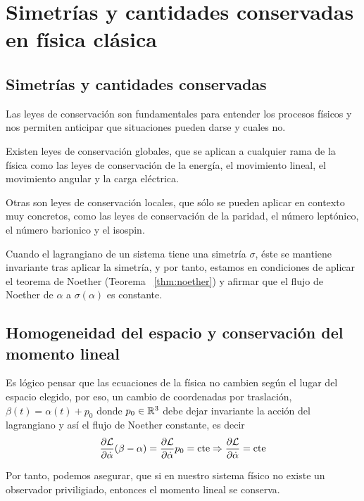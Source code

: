 \chapter{Simetrías y cantidades conservadas en física clásica}\label{ch:simetrias-y-cantidades-conservadas-en-fisica-clasica}

\section{Simetrías y cantidades conservadas}\label{sec:simetrias-y-cantidades-conservadas}

Las leyes de conservación son fundamentales para entender los procesos físicos y nos permiten anticipar que situaciones pueden darse y cuales no.

Existen leyes de conservación globales, que se aplican a cualquier rama de la física como las leyes de conservación de la energía, el movimiento lineal, el movimiento angular y la carga eléctrica.

Otras son leyes de conservación locales, que sólo se pueden aplicar en contexto muy concretos, como las leyes de conservación de la paridad, el número leptónico, el número barionico y el isospin.

Cuando el lagrangiano de un sistema tiene una simetría $\sigma$, éste se mantiene invariante tras aplicar la simetría, y por tanto, estamos en condiciones de aplicar el teorema de Noether (Teorema ~\eqref{thm:noether}) y afirmar que el flujo de Noether de $\alpha$ a $\sigma(\alpha)$ es constante.

\section{Homogeneidad del espacio y conservación del momento lineal}\label{sec:homogeneidad-del-espacio-y-conservacion-del-momento-lineal}
Es lógico pensar que las ecuaciones de la física no cambien según el lugar del espacio elegido, por eso, un cambio de coordenadas por traslación, $\beta(t)=\alpha(t)+p_0$ donde $p_0\in\mathbb{R}^3$ debe dejar invariante la acción del lagrangiano y así el flujo de Noether constante, es decir
\begin{equation}
	\label{eq:conservacion_momento_lineal}
	\frac{\partial \mathcal{L}}{\partial\dot{\alpha}}(\beta-\alpha) = \frac{\partial \mathcal{L}}{\partial\dot{\alpha}}p_0=\text{cte}\Rightarrow\frac{\partial \mathcal{L}}{\partial\dot{\alpha}}=\text{cte}
\end{equation}

Por tanto, podemos asegurar, que si en nuestro sistema físico no existe un observador priviligiado, entonces el momento lineal se conserva.

